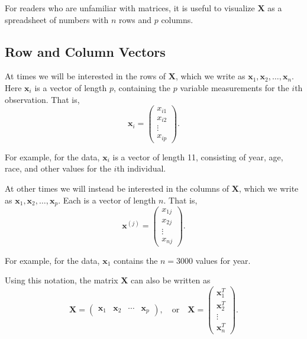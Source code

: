 For readers who are unfamiliar with matrices, it is useful to visualize \( \mathbf{X} \) as a spreadsheet of numbers with \( n \) rows and \( p \) columns.

\subsection{Row and Column Vectors}

At times we will be interested in the rows of \( \mathbf{X} \), which we write as \( \mathbf{x}_1, \mathbf{x}_2, \ldots, \mathbf{x}_n \). Here \( \mathbf{x}_i \) is a vector of length \( p \), containing the \( p \) variable measurements for the \( i \)th observation. That is,
\begin{equation}
\mathbf{x}_i = 
\begin{pmatrix}
x_{i1} \\
x_{i2} \\
\vdots \\
x_{ip}
\end{pmatrix}.
\end{equation}

For example, for the  data, \( \mathbf{x}_i \) is a vector of length 11, consisting of year, age, race, and other values for the \( i \)th individual.

At other times we will instead be interested in the columns of \( \mathbf{X} \), which we write as \( \mathbf{x}_{1}, \mathbf{x}_{2}, \ldots, \mathbf{x}_{p} \). Each is a vector of length \( n \). That is,
\[
\mathbf{x}^{(j)} =
\begin{pmatrix}
x_{1j} \\
x_{2j} \\
\vdots \\
x_{nj}
\end{pmatrix}.
\]

For example, for the  data, \( \mathbf{x}_{1} \) contains the \( n = 3000 \) values for year.

Using this notation, the matrix \( \mathbf{X} \) can also be written as
\[
\mathbf{X} = 
\begin{pmatrix}
\mathbf{x}_{1} & \mathbf{x}_{2} & \cdots & \mathbf{x}_{p}
\end{pmatrix},
\quad \text{or} \quad
\mathbf{X} = 
\begin{pmatrix}
\mathbf{x}_1^T \\
\mathbf{x}_2^T \\
\vdots \\
\mathbf{x}_n^T
\end{pmatrix}.
\]

